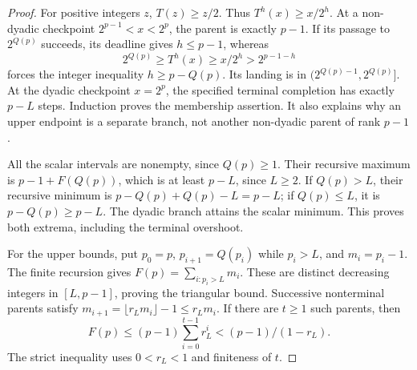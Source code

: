 \begin{proof}
For positive integers \(z\), \(T(z)\ge z/2\). Thus
\(T^h(x)\ge x/2^h\). At a non-dyadic checkpoint
\(2^{p-1}<x<2^p\), the parent is exactly \(p-1\).
If its passage to \(2^{Q(p)}\) succeeds, its deadline gives \(h\le p-1\),
whereas
\[
 2^{Q(p)}\ge T^h(x)\ge x/2^h>2^{p-1-h}
\]
forces the integer inequality \(h\ge p-Q(p)\).
Its landing is in \((2^{Q(p)-1},2^{Q(p)}]\).
At the dyadic checkpoint \(x=2^p\), the specified terminal completion
has exactly \(p-L\) steps. Induction proves the membership assertion.
It also explains why an upper endpoint is a separate branch, not
another non-dyadic parent of rank \(p-1\).

All the scalar intervals are nonempty, since \(Q(p)\ge1\).
Their recursive maximum is \(p-1+F(Q(p))\), which is at least
\(p-L\), since \(L\ge2\). If \(Q(p)>L\), their recursive minimum is
\(p-Q(p)+Q(p)-L=p-L\); if \(Q(p)\le L\), it is
\(p-Q(p)\ge p-L\). The dyadic branch attains the scalar minimum.
This proves both extrema, including the terminal overshoot.

For the upper bounds, put \(p_0=p\), \(p_{i+1}=Q(p_i)\) while
\(p_i>L\), and \(m_i=p_i-1\). The finite recursion gives
\(F(p)=\sum_{i:p_i>L}m_i\).
These are distinct decreasing integers in \([L,p-1]\), proving
the triangular bound. Successive nonterminal parents satisfy
\(m_{i+1}=\lfloor r_Lm_i\rfloor-1\le r_Lm_i\).
If there are \(t\ge1\) such parents, then
\[
 F(p)\le(p-1)\sum_{i=0}^{t-1}r_L^i
       <(p-1)/(1-r_L).
\]
The strict inequality uses \(0<r_L<1\) and finiteness of \(t\).
\end{proof}

